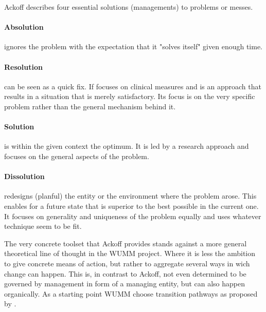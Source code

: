 \documentclass[a4paper,11pt]{article}
\begin{document}
Ackoff describes four essential solutions (managements) to problems or messes.

\paragraph{Absolution}
ignores the problem with the expectation that it "solves itself" given enough
time.

\paragraph{Resolution}
can be seen as a quick fix. If focuses on clinical measures and is an approach
that results in a situation that is merely satisfactory. Its focus is on the
very specific problem rather than the general mechanism behind it.

\paragraph{Solution}
is within the given context the optimum. It is led by a research approach and
focuses on the general aspects of the problem.

\paragraph{Dissolution}
redesigns (planful) the entity or the environment where the problem arose.
This enables for a future state that is superior to the best possible in the
current one. It focuses on generality and uniqueness of the problem equally
and uses whatever technique seem to be fit.
\bigskip

The very concrete toolset that Ackoff provides stands against a more general
theoretical line of thought in the WUMM project.  Where it is less the
ambition to give concrete means of action, but rather to aggregate several
ways in wich change can happen. This is, in contrast to Ackoff, not even
determined to be governed by management in form of a managing entity, but can
also happen organically. As a starting point WUMM choose transition pathways
as proposed by \cite{geels2007typology}.
\end{document}
